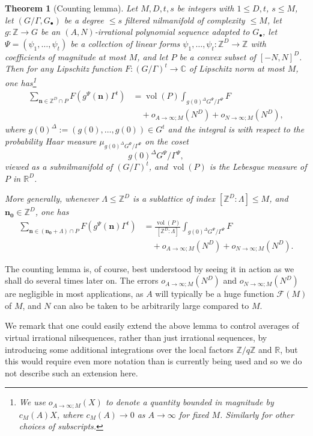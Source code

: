 \documentclass[11pt,reqno]{amsart}
\numberwithin{equation}{section}
\theoremstyle{plain}
\newtheorem{theorem}[subsection]{Theorem}
\theoremstyle{definition}
\renewcommand{\leq}{\leqslant}
\newcommand\Z{\mathbb{Z}}
\newcommand\R{\mathbb{R}}
\newcommand\C{\mathbb{C}}
\newcommand\1{{\bf 1}}
\newcommand\2{{\bf 2}}
\newcommand\Grow{{\mathcal F}}
\begin{document}
\begin{theorem}[Counting lemma]\label{count-lem}  Let $M,D,t,s$ be integers with $1 \leq D, t$, $s \leq M$, let $(G/\Gamma,G_\bullet)$ be a degree $\leq s$ filtered nilmanifold of complexity $\leq M$, let $g: \Z \to G$ be an $(A,N)$-irrational polynomial sequence adapted to $G_\bullet$, let $\Psi = (\psi_1,\ldots,\psi_t)$ be a collection of linear forms $\psi_1,\ldots,\psi_t: \Z^D \to \Z$ with coefficients of magnitude at most $M$, and let $P$ be a convex subset of $[-N,N]^{D}$.  Then for any Lipschitz function $F: (G/\Gamma)^t \to \C$ of Lipschitz norm at most $M$, one has\footnote{We use $o_{A \to \infty;M}(X)$ to denote a quantity bounded in magnitude by $c_M(A) X$, where $c_M(A) \to 0$ as $A \to \infty$ for fixed $M$.  Similarly for other choices of subscripts.} 
\begin{align*}
 \sum_{\mathbf{n} \in \Z^D \cap P} F(g^\Psi(\mathbf{n})\Gamma^t) 
 &= \operatorname{vol}(P) \int_{g(0)^\Delta G^{\Psi}/\Gamma^{\Psi}} F \\
 &\quad + o_{A \to \infty;M}( N^D ) + o_{N \to \infty; M}(N^D),
\end{align*}
where $g(0)^\Delta := (g(0),\ldots,g(0)) \in G^t$ and the integral is with respect to the probability Haar measure $\mu_{g(0)^\Delta G^{\Psi}/\Gamma^{\Psi}}$ on the coset \[ g(0)^\Delta G^{\Psi}/\Gamma^{\Psi},\] viewed as a subnilmanifold of $(G/\Gamma)^t$, and $\operatorname{vol}(P)$ is the Lebesgue measure of $P$ in $\R^D$.

More generally, whenever $\Lambda \leq \Z^D$ is a sublattice of index $[\Z^D:\Lambda] \leq M$, and $\mathbf{n_0} \in \Z^D$, one has
\begin{align*}
\sum_{\mathbf{n} \in (\mathbf{n_0}+\Lambda) \cap P} F(g^\Psi(\mathbf{n})\Gamma^t) &= \frac{\operatorname{vol}(P) }{[\Z^D:\Lambda]} \int_{g(0)^\Delta G^{\Psi}/\Gamma^{\Psi}} F\\
&\quad  + o_{A \to \infty;M}( N^D ) + o_{N \to \infty; M}(N^D).
\end{align*}
\end{theorem}

The counting lemma is, of course, best understood by seeing it in action as we shall do several times later on.  The errors $o_{A \to \infty;M}(N^D)$ and $o_{N \to \infty;M}(N^D)$ are negligible in most applications, as $A$ will typically be a huge function $\Grow(M)$ of $M$, and $N$ can also be taken to be arbitrarily large compared to $M$.

We remark that one could easily extend the above lemma to control averages of virtual irrational nilsequences, rather than just irrational sequences, by introducing some additional integrations over the local factors $\Z/q\Z$ and $\R$, but this would require even more notation than is currently being used and so we do not describe such an extension here.\vspace{11pt}
\end{document}
